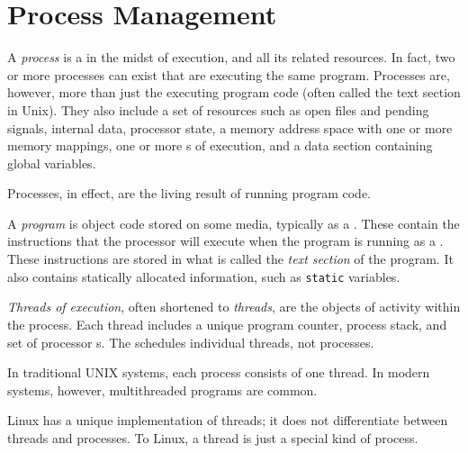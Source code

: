 \section{Process Management}\label{sec:Process_Management}
\begin{definition}[Process]\label{def:Process}
  A \emph{process} is a  in the midst of execution, and all its related resources.
  In fact, two or more processes can exist that are executing the same program.
  Processes are, however, more than just the executing program code (often called the text section in Unix).
  They also include a set of resources such as open files and pending signals, internal  data, processor state, a memory address space with one or more memory mappings, one or more s of execution, and a data section containing global variables.

  Processes, in effect, are the living result of running program code.
\end{definition}

\begin{definition}[Program]\label{def:Program}
  A \emph{program} is object code stored on some media, typically as a .
  These contain the instructions that the processor will execute when the program is running as a .
  These instructions are stored in what is called the \emph{text section} of the program.
  It also contains statically allocated information, such as \texttt{static} variables.
\end{definition}

\begin{definition}[Thread]\label{def:Thread}
  \emph{Threads of execution}, often shortened to \emph{threads}, are the objects of activity within the process.
  Each thread includes a unique program counter, process stack, and set of processor s.
  The  schedules individual threads, not processes.

  In traditional UNIX systems, each process consists of one thread.
  In modern systems, however, multithreaded programs are common.

  \begin{remark}\label{rmk:Linux_Threads}
    Linux has a unique implementation of threads; it does not differentiate between threads and processes.
    To Linux, a thread is just a special kind of process.
  \end{remark}
\end{definition}


